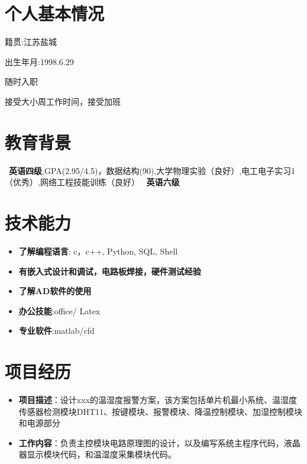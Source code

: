 \documentclass{resume}
\begin{document}
\section{个人基本情况}
\par {籍贯:江苏盐城} \par {出生年月:1998.6.29} \par {随时入职} \par {接受大小周工作时间，接受加班}

\section{教育背景}
\ \textbf{英语四级},GPA(2.95/4.5)，数据结构(90),大学物理实验（良好）,电工电子实习1（优秀）,网络工程技能训练（良好）
\ \textbf{英语六级}

\section{技术能力}
\begin{itemize}[parsep=0.2ex]
 \item \textbf{了解编程语言}: c，c++, Python, SQL, Shell
 \item \textbf{有嵌入式设计和调试，电路板焊接，硬件测试经验}
 \item \textbf{了解AD软件的使用}
  \item \textbf{办公技能}:office/ Latex
 \item \textbf{专业软件}:matlab/cfd
\end{itemize}

\section{项目经历}
\begin{itemize}
\item \textbf{项目描述}：设计xxx的温湿度报警方案，该方案包括单片机最小系统、温湿度传感器检测模块DHT11、按键模块、报警模块、降温控制模块、加湿控制模块和电源部分
\item\textbf{工作内容}：负责主控模块电路原理图的设计，以及编写系统主程序代码，液晶器显示模块代码，和温湿度采集模块代码。
\end{itemize}
\end{document}

